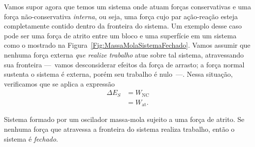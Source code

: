 Vamos supor agora que temos um sistema onde atuam forças conservativas e uma força não-conservativa \emph{interna}, ou seja, uma força cujo par ação-reação esteja completamente contido dentro da fronteira do sistema. Um exemplo desse caso pode ser uma força de atrito entre um bloco e uma superfície em um sistema como o mostrado na Figura~\ref{Fig:MassaMolaSistemaFechado}. Vamos assumir que nenhuma força externa \emph{que realize trabalho} atue sobre tal sistema, atravessando sua fronteira ---~vamos desconsiderar efeitos da força de arrasto; a força normal sustenta o sistema é externa, porém seu trabalho é nulo~---. Nessa situação, verificamos que se aplica a expressão
\begin{align}
    \Delta E_S &= W_{\textrm{NC}} \\
    &= W_{\textrm{at}}.
\end{align}

\begin{marginfigure}
\centering
{}
\caption{Sistema formado por um oscilador massa-mola sujeito a uma força de atrito. Se nenhuma força que atravessa a fronteira do sistema realiza trabalho, então o sistema é \emph{fechado}.\label{Fig:MassaMolaSistemaFechado}}
\end{marginfigure}

